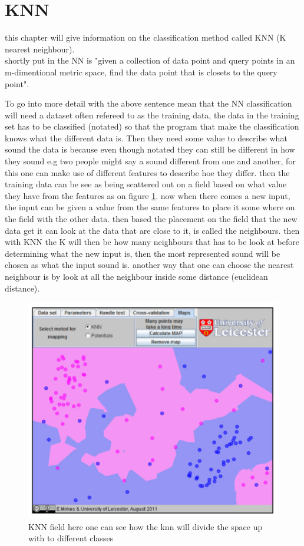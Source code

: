 \section{KNN}
this chapter will give information on the classification method called KNN (K nearest neighbour).\\
shortly put in \citep{meaningfulNN} the NN is "given a collection of data point and query points in an m-dimentional metric space, find the data point that is closets to the query point".


To go into more detail with the above sentence mean that the NN classification will need a dataset often refereed to as the training data, the data in the training set has to be classified (notated) so that the program that make the classification knows what the different data is. Then they need some value to describe what sound the data is  because even though notated they can still be different in how they sound e.g two people might say a sound different from one and another, for this one can make use of different features to describe hoe they differ. then the training data can be see as being scattered out on a field based on what value they have from the features as on figure \ref{KNN fig}. now when there comes a new input, the input can be given a value from the same features to place it some where on the field with the other data. then based the placement on the field that the new data get it can look at the data that are close to it, is called the neighbours. then with KNN the K will then be how many neighbours that has to be look at before determining what the new input is, then the most represented sound will be chosen as what the input sound is. another way that one can choose the nearest neighbour is by look at all the neighbour inside some distance (euclidean distance)\citep{NNHD}.
\begin{figure}[h]
	\begin{center}
		\includegraphics[scale = 0.5]{fig/KNNfig.jpg}
		\caption{KNN field here one can see how the knn will divide the space up with to different classes \citep{introKNN}}
		\label{KNN fig}
	\end{center}
\end{figure}
